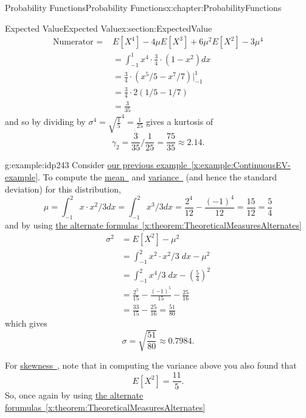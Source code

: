 \documentclass[oneside,10pt,]{book}
\newcommand{\xreffont}{\relax}
\numberwithin{equation}{section}
\begin{document}
\begin{chapterptx}{Probability Functions}{}{Probability Functions}{}{}{x:chapter:ProbabilityFunctions}
\begin{sectionptx}{Expected Value}{}{Expected Value}{}{}{x:section:ExpectedValue}
\begin{align*}
\text{Numerator = } & E[X^4] - 4 \mu E[X^3] + 6 \mu^2 E[X^2] - 3 \mu^4\\
& = \int_{-1}^1 x^4 \cdot \frac{3}{4} \cdot (1-x^2) dx\\
& = \frac{3}{4} \cdot (x^5 /5-x^7 /7) \big |_{-1}^1\\
& = \frac{3}{4} \cdot 2(1/5-1/7)\\
& = \frac{3}{35}
\end{align*}
and so by dividing by \(\sigma^4 = \sqrt{\frac{1}{5}}^4 = \frac{1}{25}\) gives a kurtosis of%
\begin{equation*}
\gamma_2 = \frac{3}{35} / \frac{1}{25} = \frac{75}{35} \approx 2.14.
\end{equation*}
%
\par
\begin{example}{}{g:example:idp243}%
Consider \hyperref[x:example:ContinuousEV-example]{our previous example~{\xreffont\ref{x:example:ContinuousEV-example}}}. To compute the \hyperlink{x:li:TheoreticalMean}{mean~{\xreffont 1}} and \hyperlink{x:li:TheoreticalVariance}{variance~{\xreffont 2}} (and hence the standard deviation) for this distribution,%
\begin{equation*}
\mu = \int_{-1}^2 x \cdot x^2/3 dx = \int_{-1}^2 x^3/3 dx = \frac{2^4}{12} - \frac{(-1)^4}{12} = \frac{15}{12} = \frac{5}{4}
\end{equation*}
and by using \hyperref[x:theorem:TheoreticalMeasuresAlternates]{the alternate formulas~{\xreffont\ref{x:theorem:TheoreticalMeasuresAlternates}}}%
\begin{align*}
\sigma^2 & = E[X^2] - \mu^2\\
& = \int_{-1}^2 x^2 \cdot x^2/3 \; dx - \mu^2\\
& = \int_{-1}^2 x^4/3 \; dx - \left ( \frac{5}{4} \right )^2\\
& = \frac{2^5}{15} - \frac{(-1)^5}{15} - \frac{25}{16}\\
& = \frac{33}{15} - \frac{25}{16} = \frac{51}{80}
\end{align*}
which gives%
\begin{equation*}
\sigma = \sqrt{\frac{51}{80}} \approx 0.7984.
\end{equation*}
%
\par
For \hyperlink{x:li:TheoreticalSkewness}{skewness~{\xreffont 3}}, note that in computing the variance above you also found that%
\begin{equation*}
E[X^2] = \frac{11}{5}.
\end{equation*}
So, once again by using \hyperref[x:theorem:TheoreticalMeasuresAlternates]{the alternate forumulas~{\xreffont\ref{x:theorem:TheoreticalMeasuresAlternates}}}%

\end{example}
\end{sectionptx}
\end{chapterptx}
\end{document}
